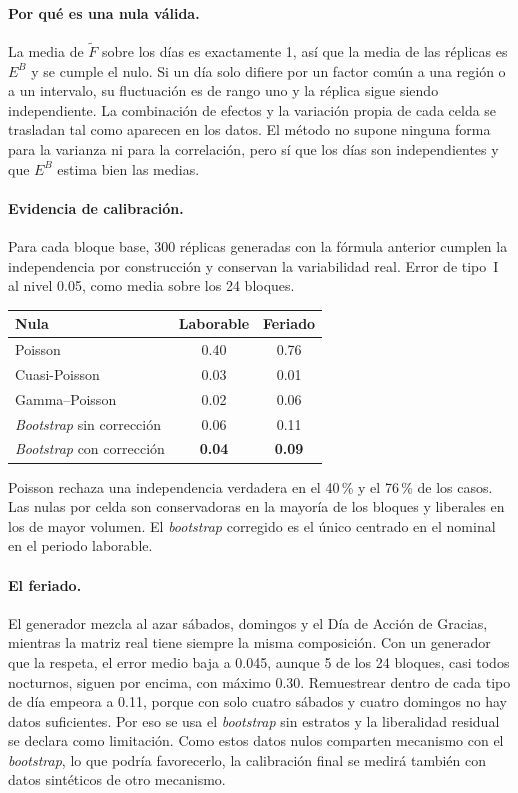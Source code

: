 \documentclass[11pt,a4paper]{article}
\begin{document}
\paragraph{Por qué es una nula válida.} La media de $\tilde F$ sobre los días es
exactamente 1, así que la media de las réplicas es $E^B$ y se cumple el nulo. Si un
día solo difiere por un factor común a una región o a un intervalo, su fluctuación
es de rango uno y la réplica sigue siendo independiente. La combinación de efectos y
la variación propia de cada celda se trasladan tal como aparecen en los datos. El
método no supone ninguna forma para la varianza ni para la correlación, pero sí que
los días son independientes y que $E^B$ estima bien las medias.

\paragraph{Evidencia de calibración.} Para cada bloque base, 300 réplicas generadas
con la fórmula anterior cumplen la independencia por construcción y conservan la
variabilidad real. Error de tipo~I al nivel 0.05, como media sobre los 24 bloques.

\begin{center}
\small
\begin{tabular}{@{}lcc@{}}
\toprule
Nula & Laborable & Feriado \\
\midrule
Poisson & 0.40 & 0.76 \\
Cuasi-Poisson & 0.03 & 0.01 \\
Gamma--Poisson & 0.02 & 0.06 \\
\emph{Bootstrap} sin corrección & 0.06 & 0.11 \\
\emph{Bootstrap} con corrección & \textbf{0.04} & \textbf{0.09} \\
\bottomrule
\end{tabular}
\end{center}

Poisson rechaza una independencia verdadera en el 40\,\% y el 76\,\% de los casos.
Las nulas por celda son conservadoras en la mayoría de los bloques y liberales en los
de mayor volumen. El \emph{bootstrap} corregido es el único centrado en el nominal en
el periodo laborable.

\paragraph{El feriado.} El generador mezcla al azar sábados, domingos y el Día de
Acción de Gracias, mientras la matriz real tiene siempre la misma composición. Con un
generador que la respeta, el error medio baja a 0.045, aunque 5 de los 24 bloques,
casi todos nocturnos, siguen por encima, con máximo 0.30. Remuestrear dentro de cada
tipo de día empeora a 0.11, porque con solo cuatro sábados y cuatro domingos no hay
datos suficientes. Por eso se usa el \emph{bootstrap} sin estratos y la liberalidad
residual se declara como limitación. Como estos datos nulos comparten mecanismo con
el \emph{bootstrap}, lo que podría favorecerlo, la calibración final se medirá
también con datos sintéticos de otro mecanismo.
\end{document}
